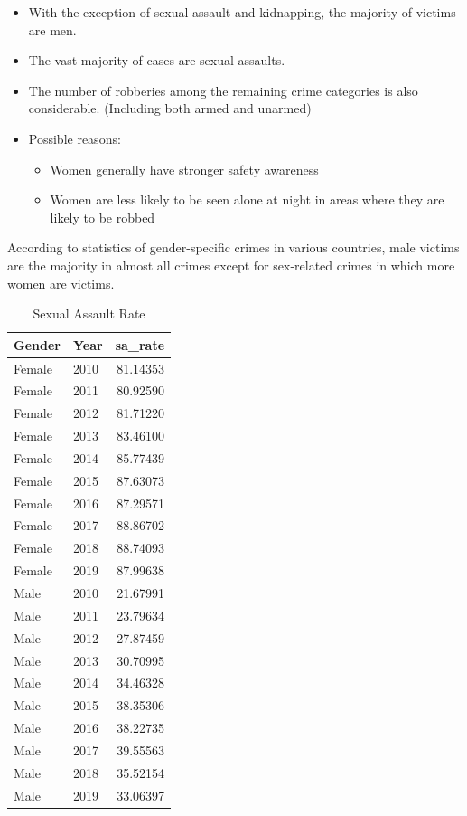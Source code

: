 \documentclass[11pt,a4paper,]{article}
\providecommand{\tightlist}{%
  \setlength{\itemsep}{0pt}\setlength{\parskip}{0pt}}
\begin{document}
\begin{itemize}
\tightlist
\item
  With the exception of sexual assault and kidnapping, the majority of victims are men.
\item
  The vast majority of cases are sexual assaults.\\
\item
  The number of robberies among the remaining crime categories is also considerable. (Including both armed and unarmed)\\
\item
  Possible reasons:

  \begin{itemize}
  \tightlist
  \item
    Women generally have stronger safety awareness
  \item
    Women are less likely to be seen alone at night in areas where they are likely to be robbed
  \end{itemize}
\end{itemize}

According to statistics of gender-specific crimes in various countries, male victims are the majority in almost all crimes except for sex-related crimes in which more women are victims.

\begin{table}

\caption{\label{tab:unnamed-chunk-7}Sexual Assault Rate}
\centering
\begin{tabular}[t]{l|l|r}
\hline
Gender & Year & sa\_rate\\
\hline
Female & 2010 & 81.14353\\
\hline
Female & 2011 & 80.92590\\
\hline
Female & 2012 & 81.71220\\
\hline
Female & 2013 & 83.46100\\
\hline
Female & 2014 & 85.77439\\
\hline
Female & 2015 & 87.63073\\
\hline
Female & 2016 & 87.29571\\
\hline
Female & 2017 & 88.86702\\
\hline
Female & 2018 & 88.74093\\
\hline
Female & 2019 & 87.99638\\
\hline
Male & 2010 & 21.67991\\
\hline
Male & 2011 & 23.79634\\
\hline
Male & 2012 & 27.87459\\
\hline
Male & 2013 & 30.70995\\
\hline
Male & 2014 & 34.46328\\
\hline
Male & 2015 & 38.35306\\
\hline
Male & 2016 & 38.22735\\
\hline
Male & 2017 & 39.55563\\
\hline
Male & 2018 & 35.52154\\
\hline
Male & 2019 & 33.06397\\
\hline
\end{tabular}
\end{table}
\end{document}
